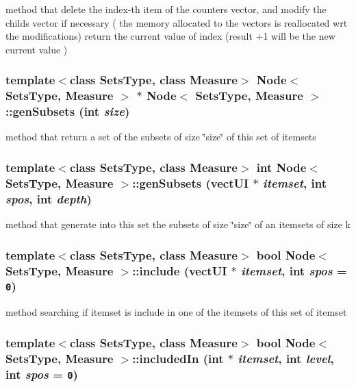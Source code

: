 method that delete the index-th item of the counters vector, and modify the childs vector if necessary ( the memory allocated to the vectors is reallocated wrt the modifications) return the current value of index (result +1 will be the new current value ) 
\subsubsection{\setlength{\rightskip}{0pt plus 5cm}template$<$class Sets\-Type, class Measure$>$ {\bf Node}$<$ Sets\-Type, Measure $>$ $\ast$ {\bf Node}$<$ Sets\-Type, Measure $>$::gen\-Subsets (int {\em size})}\label{class_node_ddd4e181cfc9990fff6e966a076cf0de}


method that return a set of the subsets of size \char`\"{}size\char`\"{} of this set of itemsets 
\subsubsection{\setlength{\rightskip}{0pt plus 5cm}template$<$class Sets\-Type, class Measure$>$ int {\bf Node}$<$ Sets\-Type, Measure $>$::gen\-Subsets (vect\-UI $\ast$ {\em itemset}, int {\em spos}, int {\em depth})}\label{class_node_767d9fa45fed21095d870913db775be6}


method that generate into this set the subsets of size \char`\"{}size\char`\"{} of an itemsets of size k 
\subsubsection{\setlength{\rightskip}{0pt plus 5cm}template$<$class Sets\-Type, class Measure$>$ bool {\bf Node}$<$ Sets\-Type, Measure $>$::include (vect\-UI $\ast$ {\em itemset}, int {\em spos} = {\tt 0})}\label{class_node_7d48901c2a01e373b4273bf92b2edf58}


method searching if itemset is include in one of the itemsets of this set of itemset 
\subsubsection{\setlength{\rightskip}{0pt plus 5cm}template$<$class Sets\-Type, class Measure$>$ bool {\bf Node}$<$ Sets\-Type, Measure $>$::included\-In (int $\ast$ {\em itemset}, int {\em level}, int {\em spos} = {\tt 0})}\label{class_node_50472949d567c7a05548943eb8ce11d6}



